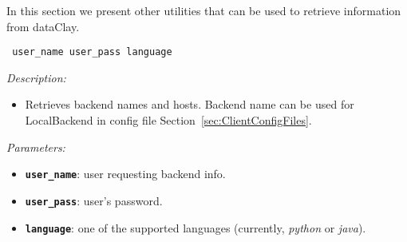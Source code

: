 In this section we present other utilities that can be used to retrieve information from dataClay.


\begin{dBox}
\texttt{ user\_name user\_pass language}
\LINE

{\it Description:}

\begin{itemize}
    \item Retrieves backend names and hosts. Backend name can be used for LocalBackend in config file Section~\ref{sec:ClientConfigFiles}.
\end{itemize}

{\it Parameters:}

\begin{itemize}
    \item \texttt{\bfseries user\_name}: user requesting backend info.
    \item \texttt{\bfseries user\_pass}: user's password.
    \item \texttt{\bfseries language}: one of the supported languages (currently, \textit{python} or \textit{java}).
\end{itemize}

\end{dBox}

